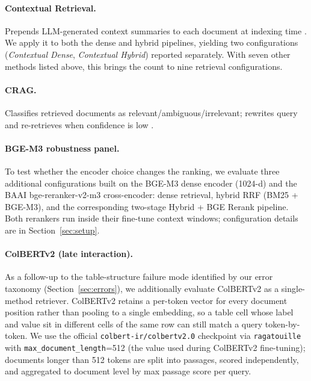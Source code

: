 \documentclass{article}
\begin{document}
\paragraph{Contextual Retrieval.} Prepends LLM-generated context summaries to each document at indexing time \citep{anthropic2024contextual}. We apply it to both the dense and hybrid pipelines, yielding two configurations (\emph{Contextual Dense}, \emph{Contextual Hybrid}) reported separately. With seven other methods listed above, this brings the count to nine retrieval configurations.

\paragraph{CRAG.} Classifies retrieved documents as relevant/ambiguous/irrelevant; rewrites query and re-retrieves when confidence is low \citep{yan2024crag}.

\paragraph{BGE-M3 robustness panel.} To test whether the encoder choice changes the ranking, we evaluate three additional configurations built on the BGE-M3 dense encoder (1024-d) \citep{chen2024bgem3} and the BAAI bge-reranker-v2-m3 cross-encoder: dense retrieval, hybrid RRF (BM25 + BGE-M3), and the corresponding two-stage Hybrid + BGE Rerank pipeline. Both rerankers run inside their fine-tune context windows; configuration details are in Section~\ref{sec:setup}.

\paragraph{ColBERTv2 (late interaction).} As a follow-up to the table-structure failure mode identified by our error taxonomy (Section~\ref{sec:errors}), we additionally evaluate ColBERTv2 \citep{santhanam2022colbertv2} as a single-method retriever. ColBERTv2 retains a per-token vector for every document position rather than pooling to a single embedding, so a table cell whose label and value sit in different cells of the same row can still match a query token-by-token. We use the official \texttt{colbert-ir/colbertv2.0} checkpoint via \texttt{ragatouille} with \texttt{max\_document\_length}=512 (the value used during ColBERTv2 fine-tuning); documents longer than 512 tokens are split into passages, scored independently, and aggregated to document level by max passage score per query.
\end{document}
